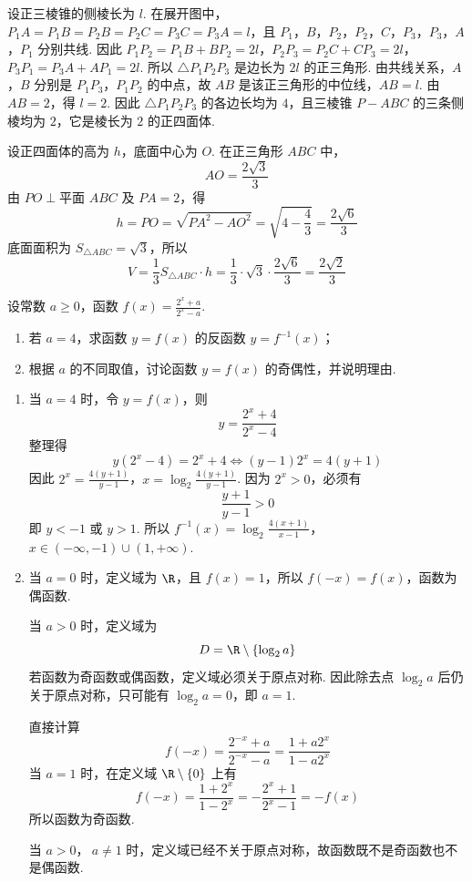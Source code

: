 \begin{solution}
设正三棱锥的侧棱长为 \(l\). 在展开图中，\(P_1A=P_1B=P_2B=P_2C=P_3C=P_3A=l\)，且 \(P_1\)，\(B\)，\(P_2\)，\(P_2\)，\(C\)，\(P_3\)，\(P_3\)，\(A\)，\(P_1\) 分别共线. 因此
\(P_1P_2=P_1B+BP_2=2l\)，\(P_2P_3=P_2C+CP_3=2l\)，\(P_3P_1=P_3A+AP_1=2l\).
所以 \(\triangle P_1P_2P_3\) 是边长为 \(2l\) 的正三角形. 由共线关系，\(A\)，\(B\) 分别是 \(P_1P_3\)，\(P_1P_2\) 的中点，故 \(AB\) 是该正三角形的中位线，\(AB=l\). 由 \(AB=2\)，得 \(l=2\). 因此 \(\triangle P_1P_2P_3\) 的各边长均为 \(4\)，且三棱锥 \(P-ABC\) 的三条侧棱均为 \(2\)，它是棱长为 \(2\) 的正四面体.

设正四面体的高为 \(h\)，底面中心为 \(O\). 在正三角形 \(ABC\) 中，
\[
AO=\frac{2\sqrt3}{3}
\]
由 \(PO\perp\text{平面 }ABC\) 及 \(PA=2\)，得
\[
h=PO=\sqrt{PA^2-AO^2}
=\sqrt{4-\frac43}
=\frac{2\sqrt6}{3}
\]
底面面积为 \(S_{\triangle ABC}=\sqrt3\)，所以
\[
V=\frac13S_{\triangle ABC}\cdot h
=\frac13\cdot\sqrt3\cdot\frac{2\sqrt6}{3}
=\frac{2\sqrt2}{3}
\]
\end{solution}

\begin{problem}
设常数 \(a \geqslant 0\)，函数 \(f(x) = \frac{2^x + a}{2^x - a}\).

\begin{enumerate}
\item 若 \(a = 4\)，求函数 \(y = f(x)\) 的反函数 \(y = f^{-1}(x)\)；
\item 根据 \(a\) 的不同取值，讨论函数 \(y = f(x)\) 的奇偶性，并说明理由.
\end{enumerate}
\end{problem}

\begin{solution}
\begin{enumerate}
\item 当 \(a=4\) 时，令 \(y=f(x)\)，则
\[
y=\frac{2^x+4}{2^x-4}
\]
整理得
\[
y(2^x-4)=2^x+4
\iff (y-1)2^x=4(y+1)
\]
因此
\(2^x=\frac{4(y+1)}{y-1}\)，\(x=\log_2\frac{4(y+1)}{y-1}\).
因为 \(2^x>0\)，必须有
\[
\frac{y+1}{y-1}>0
\]
即 \(y<-1\) 或 \(y>1\). 所以
\(f^{-1}(x)=\log_2\frac{4(x+1)}{x-1}\)，\(x\in(-\infty,-1)\cup(1,+\infty)\).
\item 当 \(a=0\) 时，定义域为 \(\R\)，且 \(f(x)=1\)，所以 \(f(-x)=f(x)\)，函数为偶函数.

当 \(a>0\) 时，定义域为
\[
D=\R\mathbin{\backslash}\{\log_2a\}
\]
若函数为奇函数或偶函数，定义域必须关于原点对称. 因此除去点 \(\log_2a\) 后仍关于原点对称，只可能有 \(\log_2a=0\)，即 \(a=1\).

直接计算
\[
f(-x)=\frac{2^{-x}+a}{2^{-x}-a}
=\frac{1+a2^x}{1-a2^x}
\]
当 \(a=1\) 时，在定义域 \(\R\mathbin{\backslash}\{0\}\) 上有
\[
f(-x)=\frac{1+2^x}{1-2^x}
=-\frac{2^x+1}{2^x-1}
=-f(x)
\]
所以函数为奇函数.

当 \(a>0\)，\(\ a\neq1\) 时，定义域已经不关于原点对称，故函数既不是奇函数也不是偶函数.
\end{enumerate}
\end{solution}

